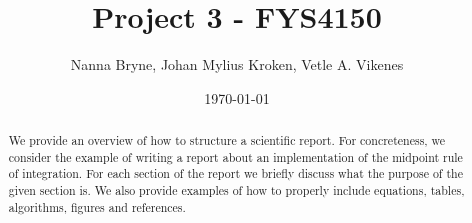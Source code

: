 



\title{Project 3 - FYS4150} 
\author{Nanna Bryne, Johan Mylius Kroken, Vetle A. Vikenes} 
\date{\today}                             
\noaffiliation                            

\begin{abstract}
    We provide an overview of how to structure a scientific report. For concreteness, we consider the example of writing a report about an implementation of the midpoint rule of integration. For each section of the report we briefly discuss what the purpose of the given section is. We also provide examples of how to properly include equations, tables, algorithms, figures and references.
\end{abstract}
\maketitle













% 
 




